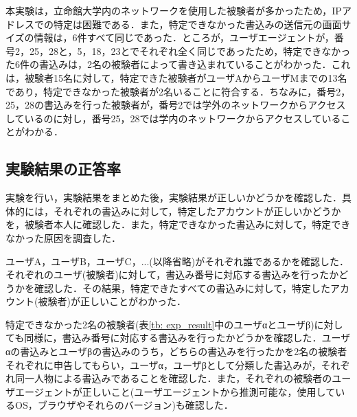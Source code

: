 \documentclass[10pt, a4paper]{jreport}
\begin{document}
本実験は，立命館大学内のネットワークを使用した被験者が多かったため，IPアドレスでの特定は困難である．また，特定できなかった書込みの送信元の画面サイズの情報は，6件すべて同じであった．ところが，ユーザエージェントが，番号2，25，28と，5，18，23とでそれぞれ全く同じであったため，特定できなかった6件の書込みは，2名の被験者によって書き込まれていることがわかった．これは，被験者15名に対して，特定できた被験者がユーザAからユーザMまでの13名であり，特定できなかった被験者が2名いることに符合する．ちなみに，番号2，25，28の書込みを行った被験者が，番号2では学外のネットワークからアクセスしているのに対し，番号25，28では学内のネットワークからアクセスしていることがわかる．

\subsection{実験結果の正答率}
実験を行い，実験結果をまとめた後，実験結果が正しいかどうかを確認した．具体的には，それぞれの書込みに対して，特定したアカウントが正しいかどうかを，被験者本人に確認した．また，特定できなかった書込みに対して，特定できなかった原因を調査した．

ユーザA，ユーザB，ユーザC，...(以降省略)がそれぞれ誰であるかを確認した．それぞれのユーザ(被験者)に対して，書込み番号に対応する書込みを行ったかどうかを確認した．その結果，特定できたすべての書込みに対して，特定したアカウント(被験者)が正しいことがわかった．

特定できなかった2名の被験者(表\ref{tb: exp_result}中のユーザαとユーザβ)に対しても同様に，書込み番号に対応する書込みを行ったかどうかを確認した．ユーザαの書込みとユーザβの書込みのうち，どちらの書込みを行ったかを2名の被験者それぞれに申告してもらい，ユーザα，ユーザβとして分類した書込みが，それぞれ同一人物による書込みであることを確認した．また，それぞれの被験者のユーザエージェントが正しいこと(ユーザエージェントから推測可能な，使用しているOS，ブラウザやそれらのバージョン)も確認した．










\end{document}
